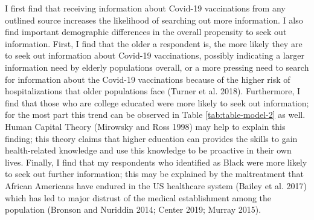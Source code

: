 I first find that receiving information about Covid-19 vaccinations from any
outlined source increases the likelihood of searching out more information. I
also find important demographic differences in the overall propensity to seek
out information. First, I find that the older a respondent is, the more likely
they are to seek out information about Covid-19 vaccinations, possibly
indicating a larger information need by elderly populations overall, or a more
pressing need to search for information about the Covid-19 vaccinations because
of the higher risk of hospitalizations that older populations face
(Turner et al. 2018). Furthermore, I find that those who are college educated were
more likely to seek out information; for the most part this trend can be
observed in Table \ref{tab:table-model-2} as well. Human Capital Theory
(Mirowsky and Ross 1998) may help to explain this finding; this theory claims that
higher education can provides the skills to gain health-related knowledge and
use this knowledge to be proactive in their own lives. Finally, I find that my
respondents who identified as Black were more likely to seek out further
information; this may be explained by the maltreatment that African Americans
have endured in the US healthcare system (Bailey et al. 2017)
which has led to major distrust of the medical establishment among the
population (Bronson and Nuriddin 2014; Center 2019; Murray 2015).


